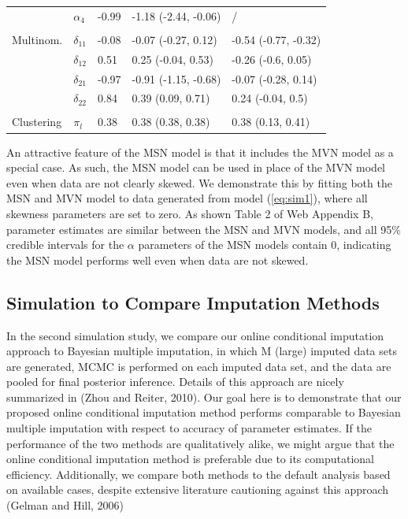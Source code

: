\documentclass[useAMS,referee]{biom}
\begin{document}
\begin{table}[t]
\begin{tabular}{lllll}
\hspace{1em} & $\alpha_{4}$ & -0.99 & -1.18 (-2.44, -0.06) &     / \\
\addlinespace[0.3em]
\multicolumn{5}{l}{\textbf{ }}\\
\hspace{1em}Multinom. & $\delta_{11}$ & -0.08 & -0.07 (-0.27, 0.12) & -0.54 (-0.77, -0.32)\\
\hspace{1em} & $\delta_{12}$ & 0.51 & 0.25 (-0.04, 0.53) & -0.26 (-0.6, 0.05)\\
\hspace{1em} & $\delta_{21}$ & -0.97 & -0.91 (-1.15, -0.68) & -0.07 (-0.28, 0.14)\\
\hspace{1em} & $\delta_{22}$ & 0.84 & 0.39 (0.09, 0.71) & 0.24 (-0.04, 0.5)\\
\addlinespace[0.3em]
\multicolumn{5}{l}{\textbf{ }}\\
\hspace{1em}Clustering & $\pi_l$ & 0.38 & 0.38 (0.38, 0.38) & 0.38 (0.13, 0.41)\\
\bottomrule
\end{tabular}
\end{table}

An attractive feature of the MSN model is that it includes the MVN model as a special case. As such, the MSN model can be used in place of the MVN model even when data are not clearly skewed. We demonstrate this by fitting both the MSN and MVN model to data generated from model (\ref{eq:sim1}), where all skewness parameters are set to zero. As shown Table 2 of Web Appendix B, parameter estimates are similar between the MSN and MVN models, and all 95\% credible intervals for the $\alpha$ parameters of the MSN models contain 0, indicating the MSN model performs well even when data are not skewed.

\subsection{Simulation to Compare Imputation Methods}

In the second simulation study, we compare our online conditional imputation approach to Bayesian multiple imputation, in which M (large) imputed data sets are generated, MCMC is performed on each imputed data set, and the data are pooled for final posterior inference. Details of this approach are nicely summarized in (Zhou and Reiter, 2010). Our goal here is to demonstrate that our proposed online conditional imputation method performs comparable to Bayesian multiple imputation with respect to accuracy of parameter estimates. If the performance of the two methods are qualitatively alike, we might argue that the online conditional imputation method is preferable due to its computational efficiency. Additionally, we compare both methods to the default analysis based on available cases, despite extensive literature cautioning against this approach (Gelman and Hill, 2006)
\end{document}
